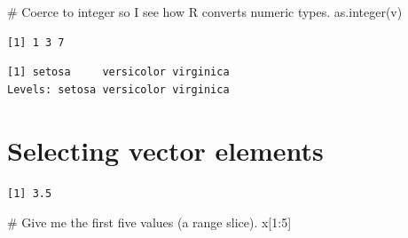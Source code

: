 \documentclass[
  letterpaper,
  DIV=11,
  numbers=noendperiod]{scrreprt}
\newenvironment{Shaded}{\begin{snugshade}}{\end{snugshade}}
\newcommand{\CommentTok}[1]{\textcolor[rgb]{0.37,0.37,0.37}{#1}}
\newcommand{\DecValTok}[1]{\textcolor[rgb]{0.68,0.00,0.00}{#1}}
\newcommand{\FunctionTok}[1]{\textcolor[rgb]{0.28,0.35,0.67}{#1}}
\newcommand{\NormalTok}[1]{\textcolor[rgb]{0.00,0.23,0.31}{#1}}
\newcommand{\OtherTok}[1]{\textcolor[rgb]{0.00,0.23,0.31}{#1}}
\newcommand{\SpecialCharTok}[1]{\textcolor[rgb]{0.37,0.37,0.37}{#1}}
\begin{document}
\begin{Shaded}
\begin{Highlighting}[]
\CommentTok{\# Coerce to integer so I see how R converts numeric types.}
\FunctionTok{as.integer}\NormalTok{(v)}
\end{Highlighting}
\end{Shaded}

\begin{verbatim}
[1] 1 3 7
\end{verbatim}

\begin{Shaded}
\end{Shaded}

\begin{verbatim}
[1] setosa     versicolor virginica 
Levels: setosa versicolor virginica
\end{verbatim}

\section{Selecting vector elements}\label{selecting-vector-elements}

\begin{Shaded}
\end{Shaded}

\begin{verbatim}
[1] 3.5
\end{verbatim}

\begin{Shaded}
\begin{Highlighting}[]
\CommentTok{\# Give me the first five values (a range slice).}
\NormalTok{x[}\DecValTok{1}\SpecialCharTok{:}\DecValTok{5}\NormalTok{]}
\end{Highlighting}
\end{Shaded}
\end{document}
